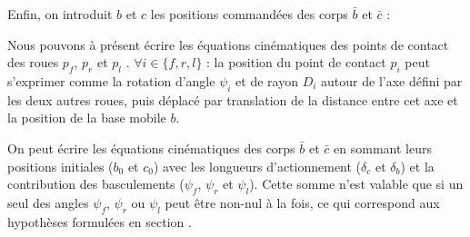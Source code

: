 					Enfin, on introduit $b$ et $c$ les positions commandées des corps $\bar{b}$ et $\bar{c}$ :
					
					
					
					Nous pouvons à présent écrire les équations cinématiques des points de contact des roues $p_f$, $p_r$ et $p_l$ .
					$\forall i\in\{f,r,l\}$ :
					la position du point de contact $p_i$ peut s'exprimer comme la rotation d'angle $\psi_i$ et de rayon $D_i$ autour de l'axe défini par les deux autres roues, 
					puis déplacé par translation de la distance entre cet axe et la position de la base mobile $b$.
					
					On peut écrire les équations cinématiques des corps $\bar{b}$ et $\bar{c}$ en sommant leurs positions initiales ($b_0$ et $c_0$) avec les longueurs d'actionnement ($\delta_c$ et $\delta_b$) et la contribution des basculements ($\psi_f$, $\psi_r$ et $\psi_l$).
					Cette somme n'est valable que si un seul des angles $\psi_f$, $\psi_r$ ou $\psi_l$ peut être non-nul à la fois, ce qui correspond aux hypothèses formulées en section . 
					
